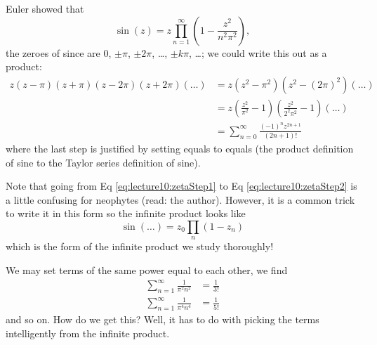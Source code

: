 Euler showed that
\begin{equation}
\sin(z)=z\prod^{\infty}_{n=1}\left(1-\frac{z^{2}}{n^{2}\pi^{2}}\right),
\end{equation}
the zeroes of since are $0$, $\pm\pi$, $\pm2\pi$, \dots, $\pm
k\pi$, \dots; we could write this out as a product:
\begin{subequations}
\begin{align}
z(z-\pi)(z+\pi)(z-2\pi)(z+2\pi)(\dots) &=
z(z^{2}-\pi^{2})(z^{2}-(2\pi)^{2})(\dots)\label{eq:lecture10:zetaStep1} \\
&= z\left(\frac{z^{2}}{\pi^{2}}-1\right)\left(\frac{z^{2}}{2^{2}\pi^{2}}-1\right)(\dots)\label{eq:lecture10:zetaStep2}\\
&= \sum^{\infty}_{n=0}\frac{(-1)^{n}z^{2n+1}}{(2n+1)!}
\end{align}
\end{subequations}
where the last step is justified by setting equals to equals (the
product definition of sine to the Taylor series definition of
sine). 
\begin{rmk}
Note that going from Eq \eqref{eq:lecture10:zetaStep1} to
Eq \eqref{eq:lecture10:zetaStep2} is a little confusing for neophytes
(read: the author). However, it is a common trick to write it in
this form so the infinite product looks like
\begin{equation}
\sin(\dots)=z_{0}\prod_{n}(1-z_{n})
\end{equation}
which is the form of the infinite product we study thoroughly!
\end{rmk}
We may set terms of the same power equal to each other, we
find
\begin{subequations}
\begin{align}
\sum^{\infty}_{n=1}\frac{1}{\pi^{2}n^{2}}&=\frac{1}{3!}\\
\sum^{\infty}_{n=1}\frac{1}{\pi^{4}n^{4}}&=\frac{1}{5!}
\end{align}
\end{subequations}
and so on. How do we get this? Well, it has to do with picking
the terms intelligently from the infinite product. 

